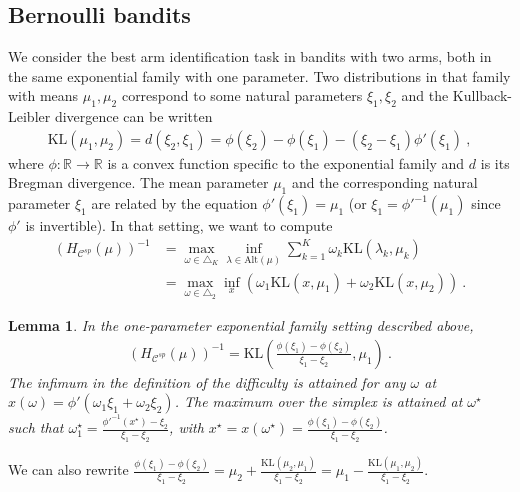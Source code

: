 \documentclass{article}
\newcommand{\KL}{\mathrm{KL}}
\newcommand{\alt}{\mathrm{Alt}}
\newtheorem{lemma}{Lemma}
\begin{document}
\subsection{Bernoulli bandits}
\label{sub:bernoulli_bai_proof}

We consider the best arm identification task in bandits with two arms, both in the same exponential family with one parameter. Two distributions in that family with means $\mu_1, \mu_2$ correspond to some natural parameters $\xi_1, \xi_2$ and the Kullback-Leibler divergence can be written
\begin{align*}
\KL(\mu_1, \mu_2) = d(\xi_2, \xi_1) = \phi(\xi_2) - \phi(\xi_1) - (\xi_2 - \xi_1) \phi'(\xi_1) \: ,
\end{align*}
where $\phi : \mathbb{R} \to \mathbb{R}$ is a convex function specific to the exponential family and $d$ is its Bregman divergence. The mean parameter $\mu_1$ and the corresponding natural parameter $\xi_1$ are related by the equation $\phi'(\xi_1) = \mu_1$ (or $\xi_1 = \phi'^{-1}(\mu_1)$ since $\phi'$ is invertible).
In that setting, we want to compute
\begin{align*}
(H_{\mathcal C^{sp}}(\mu))^{-1}
&= \max_{\omega \in \triangle_K} \inf_{\lambda \in \alt(\mu)} \sum_{k=1}^K \omega_k \KL(\lambda_k, \mu_k)
\\
&= \max_{\omega \in \triangle_2} \inf_{x} (\omega_1 \KL(x, \mu_1) + \omega_2 \KL(x, \mu_2))
\: .
\end{align*}

\begin{lemma}\label{lem:exp_fam_bai}
In the one-parameter exponential family setting described above,
\begin{align*}
(H_{\mathcal C^{sp}}(\mu))^{-1} = \KL\left(\frac{\phi(\xi_1) - \phi(\xi_2)}{\xi_1 - \xi_2}, \mu_1\right) \: .
\end{align*}
The infimum in the definition of the difficulty is attained for any $\omega$ at $x(\omega) = \phi'(\omega_1 \xi_1 + \omega_2 \xi_2)$. The maximum over the simplex is attained at $\omega^\star$ such that $\omega^\star_1 = \frac{\phi'^{-1}(x^\star) - \xi_2}{\xi_1 - \xi_2}$, with $x^\star = x(\omega^\star) = \frac{\phi(\xi_1) - \phi(\xi_2)}{\xi_1 - \xi_2}$.
\end{lemma}
We can also rewrite $\frac{\phi(\xi_1) - \phi(\xi_2)}{\xi_1 - \xi_2} = \mu_2 + \frac{\KL(\mu_2, \mu_1)}{\xi_1 - \xi_2} = \mu_1 - \frac{\KL(\mu_1, \mu_2)}{\xi_1 - \xi_2}$.
\end{document}
